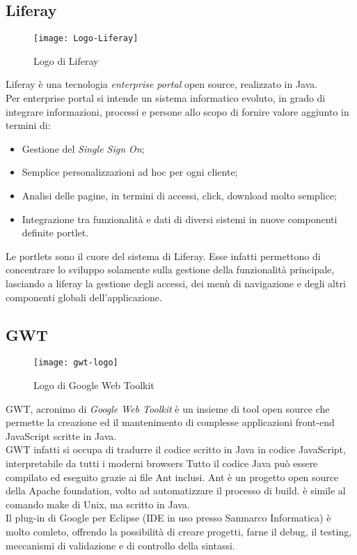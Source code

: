 \subsection{Liferay}
\begin{figure}[h]
	\centering
	\texttt{[image: Logo-Liferay]}
	\caption{Logo di Liferay}
\end{figure}
Liferay è una tecnologia \emph{enterprise portal} open source, realizzato in Java.\\
Per enterprise portal si intende un sistema informatico evoluto, in grado di integrare informazioni, processi e persone allo scopo di fornire valore aggiunto in termini di:
\begin{itemize}
	\item Gestione del \emph{Single Sign On};
	\item Semplice personalizzazioni ad hoc per ogni cliente;
	\item Analisi delle pagine, in termini di accessi, click, download molto semplice;
	\item Integrazione tra funzionalità e dati di diversi sistemi in nuove componenti definite \gls{portlet}. 
\end{itemize}
Le portlets sono il cuore del sistema di Liferay. Esse infatti permettono di concentrare lo sviluppo solamente sulla gestione della funzionalità principale, lasciando a liferay la gestione degli accessi, dei menù di navigazione e degli altri componenti globali dell'applicazione.\\
\subsection{GWT}
\begin{figure}[h]
	\centering
	\texttt{[image: gwt-logo]}
	\caption{Logo di Google Web Toolkit}
\end{figure} 
GWT, acronimo di \emph{Google Web Toolkit} è un insieme di tool open source che permette la creazione ed il mantenimento di complesse applicazioni front-end JavaScript scritte in Java.\\
GWT infatti si occupa di tradurre il codice scritto in Java in codice JavaScript, interpretabile da tutti i moderni browsers Tutto il codice Java può essere compilato ed eseguito grazie ai file Ant inclusi.
Ant è un progetto open source della Apache foundation, volto ad automatizzare il processo di build. è simile al comando make di Unix, ma scritto in Java. \\ %
Il plug-in di Google per Eclipse (IDE in uso presso Sanmarco Informatica) è molto comleto, offrendo la possibilità di creare progetti, farne il debug, il testing, meccanismi di validazione e di controllo della sintassi.\\
